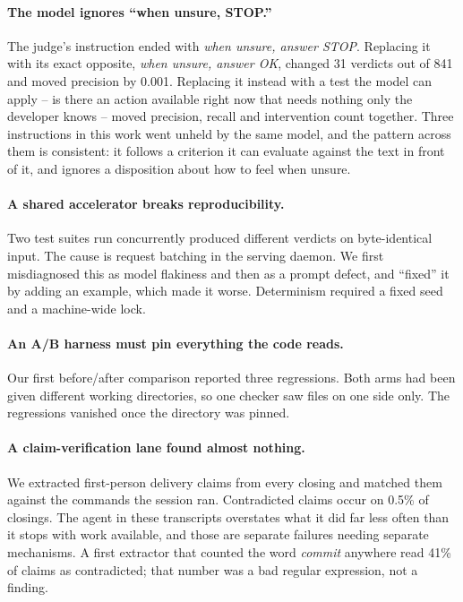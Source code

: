\paragraph{The model ignores ``when unsure, STOP.''} The judge's instruction ended with
\emph{when unsure, answer STOP}. Replacing it with its exact opposite,
\emph{when unsure, answer OK}, changed 31 verdicts out of 841 and moved
precision by 0.001. Replacing it instead with a test the model can apply --
is there an action available right now that needs nothing only the developer
knows -- moved precision, recall and intervention count together. Three
instructions in this work went unheld by the same model, and the pattern
across them is consistent: it follows a criterion it can evaluate against the
text in front of it, and ignores a disposition about how to feel when unsure.

\paragraph{A shared accelerator breaks reproducibility.} Two test suites run
concurrently produced different verdicts on byte-identical input. The cause is
request batching in the serving daemon. We first misdiagnosed this as model
flakiness and then as a prompt defect, and ``fixed'' it by adding an example,
which made it worse. Determinism required a fixed seed and a machine-wide lock.

\paragraph{An A/B harness must pin everything the code reads.} Our first
before/after comparison reported three regressions. Both arms had been given
different working directories, so one checker saw files on one side only. The
regressions vanished once the directory was pinned.

\paragraph{A claim-verification lane found almost nothing.} We extracted
first-person delivery claims from every closing and matched them against the
commands the session ran. Contradicted claims occur on 0.5\% of closings.
The agent in these transcripts overstates what it did far less often than it
stops with work available, and those are separate failures needing separate
mechanisms. A first extractor that counted the word \emph{commit} anywhere
read 41\% of claims as contradicted; that number was a bad regular expression,
not a finding.


